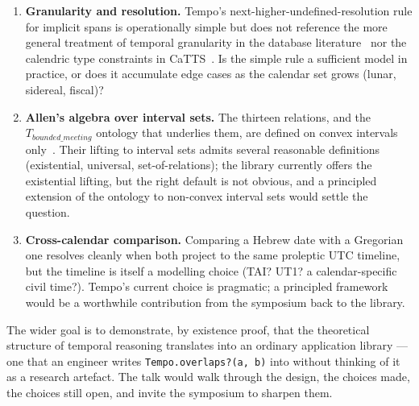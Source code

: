 \begin{enumerate}
  \item \textbf{Granularity and resolution.} Tempo's
    next-higher-undefined-resolution rule for implicit spans is
    operationally simple but does not reference the more general
    treatment of temporal granularity in the database
    literature~\cite{bettini-granularities} nor the calendric type
    constraints in CaTTS~\cite{bry-spranger-multicalendar}. Is the
    simple rule a sufficient model in practice, or does it accumulate
    edge cases as the calendar set grows (lunar, sidereal, fiscal)?

  \item \textbf{Allen's algebra over interval sets.} The thirteen
    relations, and the $T_{bounded\_meeting}$ ontology that
    underlies them, are defined on convex intervals
    only~\cite{gruninger2017allenontology}. Their lifting to interval
    sets admits several reasonable definitions
    (existential, universal, set-of-relations); the library currently
    offers the existential lifting, but the right default is not
    obvious, and a principled extension of the ontology to non-convex
    interval sets would settle the question.

  \item \textbf{Cross-calendar comparison.} Comparing a Hebrew date
    with a Gregorian one resolves cleanly when both project to the
    same proleptic UTC timeline, but the timeline is itself a
    modelling choice (TAI? UT1? a calendar-specific civil time?).
    Tempo's current choice is pragmatic; a principled framework would
    be a worthwhile contribution from the symposium back to the
    library.
\end{enumerate}

The wider goal is to demonstrate, by existence proof, that the
theoretical structure of temporal reasoning translates into an
ordinary application library --- one that an engineer writes
\texttt{Tempo.overlaps?(a, b)} into without thinking of it as a
research artefact. The talk would walk through the design, the
choices made, the choices still open, and invite the symposium to
sharpen them.

